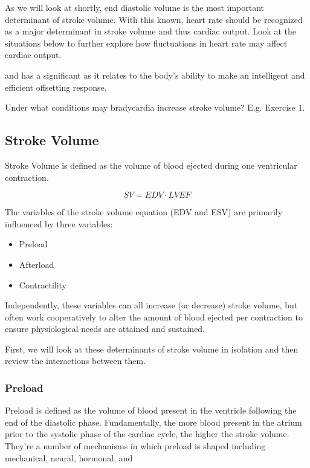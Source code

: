 As we will look at shortly, end diastolic volume is the most important determinant of stroke volume. With this known, heart rate should be recognized as a major determinant in stroke volume and thus cardiac output. Look at the situations below to further explore how fluctuations in heart rate may affect cardiac output. 


and has a significant  as it relates to the body's ability to make an intelligent and efficient offsetting response.

Under what conditions may bradycardia increase stroke volume? 
E.g. Exercise 
1. 



\subsection{Stroke Volume}

Stroke Volume is defined as the volume of blood ejected during one ventricular contraction. 

\begin{equation}
    SV = EDV \cdot LVEF
\end{equation}

The variables of the stroke volume equation (EDV and ESV) are primarily influenced by three variables: 
\begin{itemize}
    \item Preload
    \item Afterload
    \item Contractility
\end{itemize}

Independently, these variables can all increase (or decrease) stroke volume, but often work cooperatively to alter the amount of blood ejected per contraction to ensure physiological needs are attained and sustained. 

First, we will look at these determinants of stroke volume in isolation and then review the interactions between them. 

\subsubsection{\textbf{Preload}} 

Preload is defined as the volume of blood present in the ventricle following the end of the diastolic phase. Fundamentally, the more blood present in the atrium prior to the systolic phase of the cardiac cycle, the higher the stroke volume. They're a number of mechanisms in which preload is shaped including mechanical, neural, hormonal, and  

